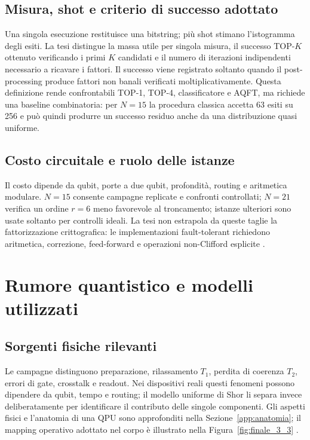 \subsection{Misura, shot e criterio di successo adottato}\label{sec:finale_3_2_3}

Una singola esecuzione restituisce una bitstring; più shot stimano l'istogramma degli esiti. La tesi distingue la massa utile per singola misura, il successo TOP-$K$ ottenuto verificando i primi $K$ candidati e il numero di iterazioni indipendenti necessario a ricavare i fattori. Il successo viene registrato soltanto quando il post-processing produce fattori non banali verificati moltiplicativamente. Questa definizione rende confrontabili TOP-1, TOP-4, classificatore e AQFT, ma richiede una baseline combinatoria: per $N=15$ la procedura classica accetta 63 esiti su 256 e può quindi produrre un successo residuo anche da una distribuzione quasi uniforme.

\subsection{Costo circuitale e ruolo delle istanze}\label{sec:finale_3_2_4}

Il costo dipende da qubit, porte a due qubit, profondità, routing e aritmetica modulare. $N=15$ consente campagne replicate e confronti controllati; $N=21$ verifica un ordine $r=6$ meno favorevole al troncamento; istanze ulteriori sono usate soltanto per controlli ideali. La tesi non estrapola da queste taglie la fattorizzazione crittografica: le implementazioni fault-tolerant richiedono aritmetica, correzione, feed-forward e operazioni non-Clifford esplicite \cite{beauregard2002,gidney2021,chevignard2025}.

\section{Rumore quantistico e modelli utilizzati}\label{sec:finale_3_3}

\subsection{Sorgenti fisiche rilevanti}\label{sec:finale_3_3_1}\label{sec:fonti_fisiche}

Le campagne distinguono preparazione, rilassamento $T_1$, perdita di coerenza $T_2$, errori di gate, crosstalk e readout. Nei dispositivi reali questi fenomeni possono dipendere da qubit, tempo e routing; il modello uniforme di Shor li separa invece deliberatamente per identificare il contributo delle singole componenti. Gli aspetti fisici e l'anatomia di una QPU sono approfonditi nella Sezione~\ref{app:anatomia}; il mapping operativo adottato nel corpo è illustrato nella Figura~\ref{fig:finale_3_3} \cite{preskill2018,murali2019,tannu2019}.

